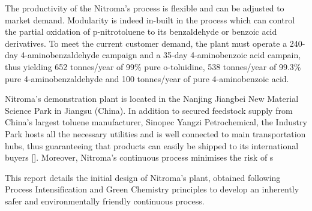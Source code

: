 The productivity of the Nitroma's process is flexible and can be adjusted to market demand. Modularity is indeed in-built in the process which can control the partial oxidation of p-nitrotoluene to its benzaldehyde or benzoic acid derivatives. To meet the current customer demand, the plant must operate a 240-day 4-aminobenzaldehyde campaign and a 35-day 4-aminobenzoic acid campain, thus yielding 652 tonnes/year of 99\% pure o-toluidine, 538 tonnes/year of 99.3\% pure 4-aminobenzaldehyde and 100 tonnes/year of pure 4-aminobenzoic acid.

Nitroma's demonstration plant is located in the Nanjing Jiangbei New Material Science Park in Jiangsu (China). In addition to secured feedstock supply from China’s largest toluene manufacturer, Sinopec Yangzi Petrochemical, the Industry Park hosts all the necessary utilities and is well connected to main transportation hubs, thus guaranteeing that products can easily be shipped to its international buyers []. Moreover, Nitroma's continuous process minimises the risk of s






This report details the initial design of Nitroma's plant, obtained following Process Intensification and Green Chemistry principles to develop an inherently safer and environmentally friendly continuous process.



